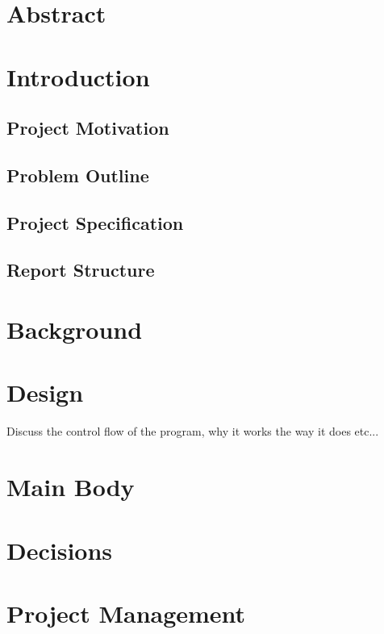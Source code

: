 \documentclass{article}
\begin{document}
\section{Abstract}

\section{Introduction}

\subsection{Project Motivation}

\subsection{Problem Outline}

\subsection{Project Specification}

\subsection{Report Structure}

\section{Background}

\section{Design}

Discuss the control flow of the program, why it works the way it does etc...

\section{Main Body}

\section{Decisions}

\section{Project Management}
\end{document}
